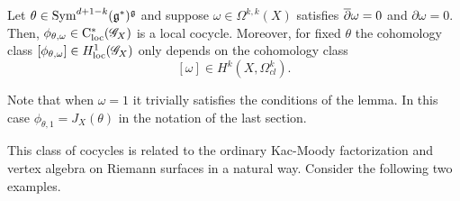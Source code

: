 \documentclass[10pt]{amsart}
\begin{document}
\begin{lem}\label{lem: cocycle KM}
Let $\theta \in {\rm Sym}^{d+1-k}(\mathfrak g^*)^\mathfrak g$ and suppose $\omega \in \Omega^{k,k}(X)$ satisfies $\overline{\partial} \omega = 0$ and $\partial \omega = 0$. 
Then, $\phi_{\theta, \omega} \in {\rm C}_{\rm loc}^*(\mathscr G_X)$ is a local cocycle. 
Moreover, for fixed $\theta$ the cohomology class $[\phi_{\theta,\omega}] \in H^1_{\rm loc}(\mathscr G_X)$ only depends on the cohomology class 
\[
[\omega] \in H^{k}(X , \Omega^k_{cl}) .
\]
\end{lem}

Note that when $\omega = 1$ it trivially satisfies the conditions of the lemma. 
In this case $\phi_{\theta, 1} = J_X(\theta)$ in the notation of the last section. 

This class of cocycles is related to the ordinary Kac-Moody factorization and vertex algebra on Riemann surfaces in a natural way.
Consider the following two examples. 
\end{document}
